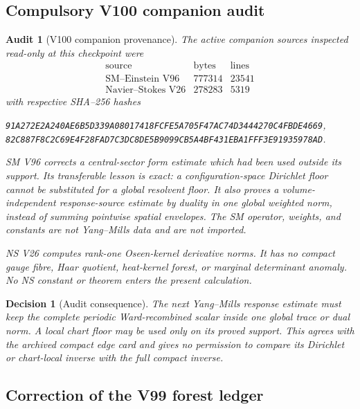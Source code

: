 \documentclass[11pt,oneside]{article}
\newtheorem{audit}[theorem]{Audit}
\newtheorem{decision}[theorem]{Decision}
\theoremstyle{definition}
\theoremstyle{remark}
\begin{document}
\subsection{Compulsory V100 companion audit}

\begin{audit}[V100 companion provenance]
\label{audit:newv100-companions}
The active companion sources inspected read-only at this checkpoint
were
\[
\begin{array}{c|r|r}
\text{source}&\text{bytes}&\text{lines}\\ \hline
\text{SM--Einstein V96}&777314&23541\\
\text{Navier--Stokes V26}&278283&5319
\end{array}                                                   \tag{100.1}
\]
with respective SHA--256 hashes
\begin{center}\scriptsize
\texttt{91A272E2A240AE6B5D339A08017418FCFE5A705F47AC74D3444270C4FBDE4669},\\
\texttt{82C887F8C2C69E4F28FAD7C3DC8DE5B9099CB5A4BF431EBA1FFF3E91935978AD}.
\end{center}

SM V96 corrects a central-sector form estimate which had been used
outside its support.  Its transferable lesson is exact: a
configuration-space Dirichlet floor cannot be substituted for a
global resolvent floor.  It also proves a volume-independent
response-source estimate by duality in one global weighted norm,
instead of summing pointwise spatial envelopes.  The SM operator,
weights, and constants are not Yang--Mills data and are not
imported.

NS V26 computes rank-one Oseen-kernel derivative norms.  It has no
compact gauge fibre, Haar quotient, heat-kernel forest, or marginal
determinant anomaly.  No NS constant or theorem enters the present
calculation.
\end{audit}

\begin{decision}[Audit consequence]
\label{dec:newv100-audit}
The next Yang--Mills response estimate must keep the complete
periodic Ward-recombined scalar inside one global trace or dual norm.
A local chart floor may be used only on its proved support.  This
agrees with the archived compact edge card and gives no permission
to compare its Dirichlet or chart-local inverse with the full
compact inverse.
\end{decision}

\subsection{Correction of the V99 forest ledger}
\end{document}
